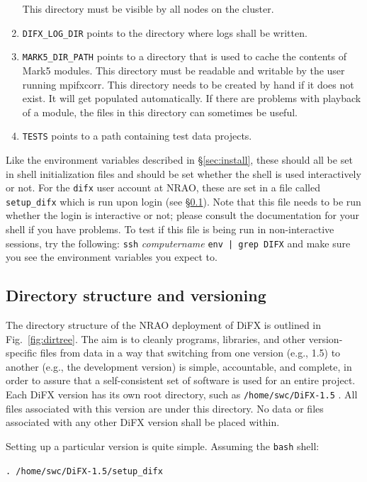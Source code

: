 \begin{enumerate}
This directory must be visible by all nodes on the cluster.
\item {\tt DIFX\_LOG\_DIR} points to the directory where logs shall be written. \difxoneone
\item {\tt MARK5\_DIR\_PATH} points to a directory that is used to cache the contents of Mark5 modules.
This directory must be readable and writable by the user running mpifxcorr.
This directory needs to be created by hand if it does not exist.  
It will get populated automatically.
If there are problems with playback of a module, the files in this directory can sometimes be useful.
\item {\tt TESTS} points to a path containing test data projects.
\end{enumerate}
Like the environment variables described in \S\ref{sec:install}, these should all be set in shell initialization files and should be set whether the shell is used interactively or not.
For the {\tt difx} user account at NRAO, these are set in a file called {\tt setup\_difx} which is run upon login (see \S\ref{sec:versions}).
Note that this file needs to be run whether the login is interactive or not; please consult the documentation for your shell if you have problems.
To test if this file is being run in non-interactive sessions, try the following: {\tt ssh} {\em computername} {\tt env | grep DIFX} and make sure you see the environment variables you expect to.


\subsection{Directory structure and versioning} \label{sec:versions}

The directory structure of the NRAO deployment of DiFX is outlined in Fig.~\ref{fig:dirtree}.
The aim is to cleanly programs, libraries, and other version-specific files from data in a way that switching from one version (e.g., 1.5) to another (e.g., the development version) is simple, accountable, and complete, in order to assure that a self-consistent set of software is used for an entire project.
Each DiFX version has its own root directory, such as {\tt /home/swc/DiFX-1.5} .
All files associated with this version are under this directory.
No data or files associated with any other DiFX version shall be placed within.

Setting up a particular version is quite simple.
Assuming the {\tt bash} shell:

{\tt . /home/swc/DiFX-1.5/setup\_difx}

